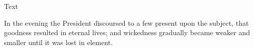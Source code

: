 					\phantom{.}
				
				\begin{description}
					\item[Text]
				\end{description}
				
					In the evening the President discoursed to a few present upon the subject, that goodness resulted in eternal lives; and wickedness gradually became weaker and smaller until it was lost in element.